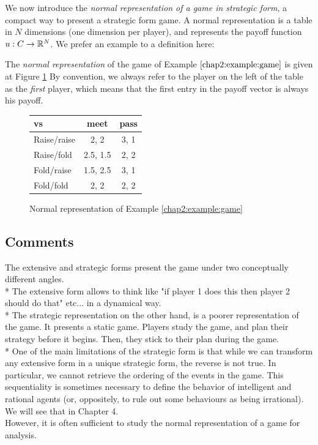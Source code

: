 We now introduce the
 \emph{normal representation of a game in strategic form}, 
a compact way to present a strategic form game. 
A normal representation is a table in $N$ dimensions
 (one dimension per player), 
 and represents the payoff function 
 $u : C \rightarrow \mathbb{R}^N$.  
 We prefer an example to a definition here:
\begin{example}
The \emph{normal representation} of the game of Example $\ref{chap2:example:game}$ is given at Figure \ref{chap2:table}
By convention, we always refer to the player on the left of the table as the \emph{first} player, 
which means that the first entry in the payoff vector is always his payoff.
\begin{figure}[!ht]
\centering
\begin{tabular}{l|cc}
\TAtwo{} vs \TAone{} & meet & pass \\
\hline
Raise/raise & 2, 2 & 3, 1 \\
Raise/fold & 2.5, 1.5 & 2, 2 \\
Fold/raise & 1.5, 2.5 & 3, 1 \\
Fold/fold & 2, 2 & 2, 2 
\end{tabular}
\caption{Normal representation of Example \ref{chap2:example:game}}
\label{chap2:table}
\end{figure}

\end{example}



\subsection{Comments}

The extensive and strategic forms present the game under two conceptually different angles.\\* 
The extensive form  allows to think like "if player 1 does this then player 2 should do that" etc... in a dynamical way. \\*
The strategic representation on the other hand, is a poorer representation of the game. It presents a static game. Players study the game, and plan their strategy before it begins. Then, they stick to their plan during the game.\\*
One of the main limitations of the strategic form is that while we can transform any extensive form in a unique strategic form, the reverse is not true. In particular, we cannot retrieve the ordering of the events in the game. 
This sequentiality is sometimes necessary to define the behavior of intelligent and rational agents (or, oppositely, to rule out some behaviours as being irrational).  We will see that in Chapter 4. \\
However, it is often sufficient to study the normal representation of a game for analysis. 

